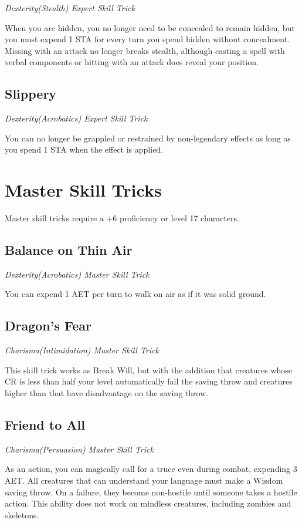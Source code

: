 \textit{Dexterity(Stealth) Expert Skill Trick}

When you are hidden, you no longer need to be concealed to remain hidden, but you must expend 1 STA for every turn you spend hidden without concealment. Missing with an attack no longer breaks stealth, although casting a spell with verbal components or hitting with an attack does reveal your position.

\subsection{Slippery}

\textit{Dexterity(Acrobatics) Expert Skill Trick}

You can no longer be grappled or restrained by non-legendary effects as long as you spend 1 STA when the effect is applied.

\section{Master Skill Tricks}
\label{sec:skill-tricks-master}

Master skill tricks require a +6 proficiency or level 17 characters.
\subsection{Balance on Thin Air}

\textit{Dexterity(Acrobatics) Master Skill Trick}

You can expend 1 AET per turn to walk on air as if it was solid ground.

\subsection{Dragon's Fear}

\textit{Charisma(Intimidation) Master Skill Trick}

This skill trick works as Break Will, but with the addition that creatures whose CR is less than half your level automatically fail the saving throw and creatures higher than that have disadvantage on the saving throw.

\subsection{Friend to All}

\textit{Charisma(Persuasion) Master Skill Trick}

As an action, you can magically call for a truce even during combat, expending 3 AET. All creatures that can understand your language must make a Wisdom saving throw. On a failure, they become non-hostile until someone takes a hostile action. This ability does not work on mindless creatures, including zombies and skeletons.

